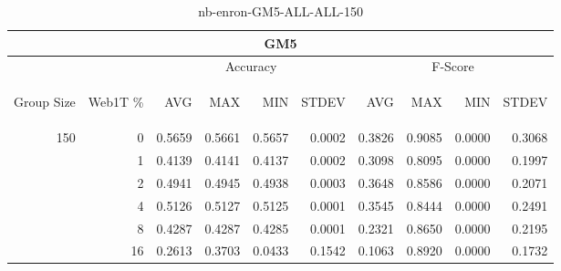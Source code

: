 \begin{center}
\begin{table}[htbp] 
 \begin{center}
\begin{tabular}{ | r | r | r | r | r | r | r | r | r | r |}
\hline
\multicolumn{10}{|c|}{GM5}\\
\hline
 & & \multicolumn{4}{|c|}{Accuracy} & \multicolumn{4}{|c|}{F-Score}\\ \cline{3-10}
\begin{sideways}Group Size\end{sideways} & \begin{sideways}Web1T \%\end{sideways} & \begin{sideways}AVG\end{sideways} & \begin{sideways}MAX\end{sideways} & \begin{sideways}MIN\end{sideways} & \begin{sideways}STDEV\end{sideways} & \begin{sideways}AVG\end{sideways} & \begin{sideways}MAX\end{sideways} & \begin{sideways}MIN\end{sideways} & \begin{sideways}STDEV\end{sideways}\\
\hline
\multirow{5}{*}{150}
 & 0 & 0.5659 & 0.5661 & 0.5657 & 0.0002 & 0.3826 & 0.9085 & 0.0000 & 0.3068\\ \cline{2-10}
 & 1 & 0.4139 & 0.4141 & 0.4137 & 0.0002 & 0.3098 & 0.8095 & 0.0000 & 0.1997\\ \cline{2-10}
 & 2 & 0.4941 & 0.4945 & 0.4938 & 0.0003 & 0.3648 & 0.8586 & 0.0000 & 0.2071\\ \cline{2-10}
 & 4 & 0.5126 & 0.5127 & 0.5125 & 0.0001 & 0.3545 & 0.8444 & 0.0000 & 0.2491\\ \cline{2-10}
 & 8 & 0.4287 & 0.4287 & 0.4285 & 0.0001 & 0.2321 & 0.8650 & 0.0000 & 0.2195\\ \cline{2-10}
 & 16 & 0.2613 & 0.3703 & 0.0433 & 0.1542 & 0.1063 & 0.8920 & 0.0000 & 0.1732\\ \cline{2-10}
\hline
\end{tabular}
\caption{nb-enron-GM5-ALL-ALL-150}
\label{table:nb-enron-GM5-ALL-ALL-150}
\end{center}
 \end{table}
\end{center}

